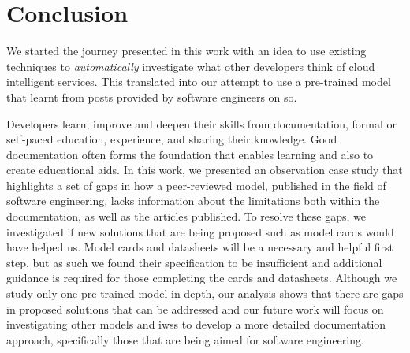 
\section{Conclusion}\label{ase2020-industry:sec:conclusion}
We started the journey presented in this work with an idea to use existing  techniques to \textit{automatically} investigate what other developers think of cloud intelligent services. This translated into our attempt to use a  pre-trained model that learnt from posts provided by software engineers on \gls{so}.

Developers learn, improve and deepen their skills from documentation, formal or self-paced education, experience, and sharing their knowledge. Good documentation often forms the foundation that enables learning and also to create educational aids. In this work, we presented an observation case study that highlights a set of gaps in how a peer-reviewed model, published in the field of software engineering, lacks information about the limitations both within the documentation, as well as the articles published. To resolve these gaps, we investigated if new solutions that are being proposed such as model cards would have helped us. Model cards and datasheets will be a necessary and helpful first step, but as such we found their specification to be insufficient and additional guidance is required for those completing the cards and datasheets. Although we study only one pre-trained model in depth, our analysis shows that there are gaps in proposed solutions that can be addressed and our future work will focus on investigating other models and \glspl{iws} to develop a more detailed documentation approach, specifically those that are being aimed for software engineering. 